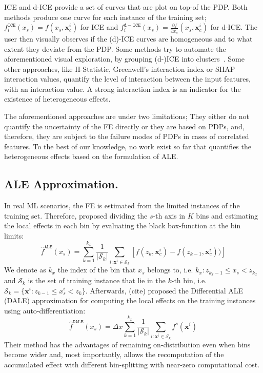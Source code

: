 \documentclass[twoside]{article}
\newcommand{\xc}{\mathbf{x}_c}
\newcommand{\xb}{\mathbf{x}}
\begin{document}
ICE and d-ICE\citep{goldstein2015peeking} provide a set of curves that
are plot on top-of the PDP. Both methods produce one curve for each
instance of the training set;
\(f^{\mathtt{ICE}}_i(x_s) = f(x_s, \xc^i)\) for ICE and
\(f^{\mathtt{d-ICE}}_i(x_s) = \frac{\partial f}{\partial x_s} (x_s,
\xc^i)\) for d-ICE. The user then visually observes if the (d)-ICE
curves are homogeneous and to what extent they deviate from the
PDP. Some methods try to automate the aforementioned visual
exploration, by grouping (d-)ICE into clusters~\citep{molnar2020model,
  herbinger2022repid, britton2019vine}. Some other approaches, like
H-Statistic\citep{friedman2008predictive}, Greenwell's interaction
index\citep{greenwell2018simple} or SHAP interaction
values\citep{lundberg2018consistent}, quantify the level of
interaction between the input features, with an interaction value. A
strong interaction index is an indicator for the existence of
heterogeneous effects.

The aforementioned approaches are under two limitations; They either
do not quantify the uncertainty of the FE directly or they are based
on PDPs, and, therefore, they are subject to the failure modes of PDPs
in cases of correlated features\citep{baniecki2021fooling}. To the
best of our knowledge, no work exist so far that quantifies the
heterogeneous effects based on the formulation of ALE.

\subsection{ALE Approximation.}
\label{sec:ale-approximation}

In real ML scenarios, the FE is estimated from the limited instances
of the training set. Therefore, \citep{apley2020visualizing} proposed
dividing the \(s\)-th axis in \(K\) bins and estimating the local
effects in each bin by evaluating the black box-function at the bin
limits:
\begin{equation}
  \label{eq:ALE_accumulated_mean_est}
  \hat{f}^{\mathtt{ALE}}(x_s) = \sum_{k=1}^{k_x} \frac{1}{|\mathcal{S}_k|} \sum_{i:\mathbf{x}^i \in
    \mathcal{S}_k} \left [ f(z_{k}, \xc^i) - f(z_{k-1}, \xc^i)) \right ]
\end{equation}
We denote as \(k_x\) the index of the bin that \(x_s\) belongs to,
i.e. \(k_x: z_{k_x-1} \leq x_s < z_{k_x} \) and \(\mathcal{S}_k\) is
the set of training instance that lie in the \(k\)-th bin, i.e.
\( \mathcal{S}_k = \{ \xb^i : z_{k-1} \leq x^i_s < z_{k} \}
\). Afterwards, (cite) proposed the Differential ALE (DALE)
approximation for computing the local effects on the training
instances using auto-differentiation:
\begin{equation}
  \label{eq:DALE_accumulated_mean_est}
  \hat{f}^{\mathtt{DALE}}(x_s) = \Delta x \sum_{k=1}^{k_x} \frac{1}{|\mathcal{S}_k|} \sum_{i:\mathbf{x}^i \in
    \mathcal{S}_k} f^s(\mathbf{x}^i)
\end{equation}
%
Their method has the advantages of remaining on-distribution even when
bins become wider and, most importantly, allows the recomputation of
the accumulated effect with different bin-splitting with near-zero
computational cost.
\end{document}

